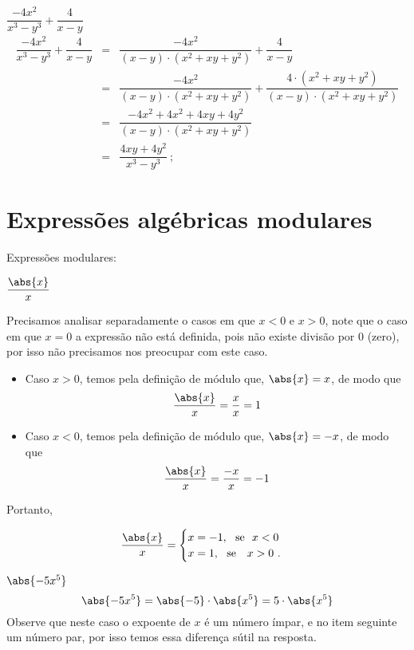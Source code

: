  \begin{exem}
  $\dfrac{-4x^2}{x^3 - y^3} + \dfrac{4}{x-y}$
  \begin{eqnarray*}
   \dfrac{-4x^2}{x^3 - y^3} + \dfrac{4}{x-y} & = & \dfrac{-4x^2}{(x-y)\cdot (x^2+xy+y^2)} + \dfrac{4}{x-y} \\
   &=& \dfrac{-4x^2}{(x-y)\cdot (x^2+xy+y^2)} + \dfrac{4 \cdot (x^2+xy+y^2)}{(x-y)\cdot (x^2+xy+y^2)} \\
   &=& \dfrac{-4x^2 + 4x^2 + 4xy + 4y^2}{(x-y) \cdot (x^2+xy+y^2)} \\
   &=& \dfrac{4xy + 4y^2}{x^3 - y^3}  \ ;
  \end{eqnarray*}
  \end{exem}
 

 
 \section{Expressões algébricas modulares}
 
 Expressões modulares:

 \begin{exem}
  $\dfrac{\abs{x}}{x}$

  Precisamos analisar separadamente o casos em que $x<0$ e $x>0$, note que o caso em que $x=0$ a expressão não está definida, pois não existe divisão por $0$ (zero), por isso não precisamos nos preocupar com este caso.

  \begin{itemize}
   \item Caso $x> 0$, temos pela definição de módulo que, $\abs{x}= x$, de modo que
\begin{equation}
\dfrac{\abs{x}}{x}=\dfrac{x}{x}= 1
\end{equation}
   \item Caso $x< 0$, temos pela definição de módulo que, $\abs{x}= -x$, de modo que
\begin{equation}
\dfrac{\abs{x}}{x}=\dfrac{-x}{x}= -1
\end{equation}
  \end{itemize}

 Portanto,

  \[ \frac{\abs{x}}{x} = \begin{cases}
      x= -1, \ \ \text{se} \ \ x< 0 \\
      x= 1, \ \ \text{se } \ \ x> 0 \ .
     \end{cases}
  \]
\end{exem}
 
 \begin{exem}
  $\abs{-5x^5}$
\begin{equation}
\abs{-5x^5}= \abs{-5}\cdot \abs{x^5}= 5 \cdot \abs{x^5}
\end{equation}
 Observe que neste caso o expoente de $x$ é um número ímpar, e no item seguinte um número par, por isso temos essa diferença sútil na resposta.
 \end{exem}
 
